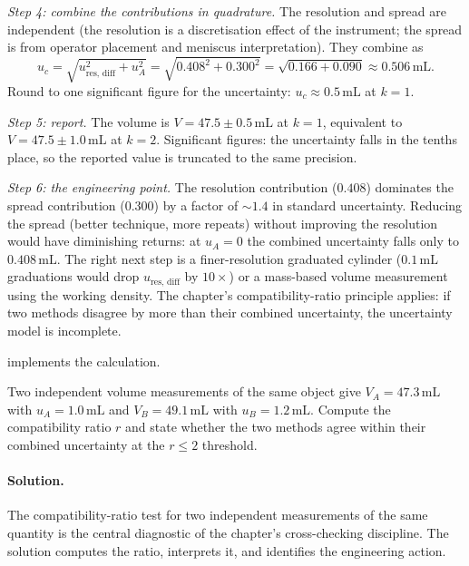 \emph{Step 4: combine the contributions in quadrature.} The
resolution and spread are independent (the resolution is a
discretisation effect of the instrument; the spread is from
operator placement and meniscus interpretation). They combine as
\[
u_{c} = \sqrt{u_{\text{res, diff}}^{2} + u_{A}^{2}} =
\sqrt{0.408^{2} + 0.300^{2}} = \sqrt{0.166 + 0.090} \approx
0.506\,\si{\milli\liter}.
\]
Round to one significant figure for the uncertainty: $u_{c}
\approx 0.5\,\si{\milli\liter}$ at $k = 1$.

\emph{Step 5: report.} The volume is $V = 47.5 \pm 0.5\,\si{\milli
\liter}$ at $k = 1$, equivalent to $V = 47.5 \pm 1.0\,\si{\milli
\liter}$ at $k = 2$. Significant figures: the uncertainty falls in
the tenths place, so the reported value is truncated to the same
precision.

\emph{Step 6: the engineering point.} The resolution contribution
($0.408$) dominates the spread contribution ($0.300$) by a factor
of $\sim 1.4$ in standard uncertainty. Reducing the spread (better
technique, more repeats) without improving the resolution would
have diminishing returns: at $u_{A} = 0$ the combined uncertainty
falls only to $0.408\,\si{\milli\liter}$. The right next step is a
finer-resolution graduated cylinder ($0.1\,\si{\milli\liter}$
graduations would drop $u_{\text{res, diff}}$ by $10\times$) or a
mass-based volume measurement using the working density. The
chapter's compatibility-ratio principle applies: if two methods
disagree by more than their combined uncertainty, the
uncertainty model is incomplete.

implements the calculation.

\begin{exercise}
Two independent volume measurements of the same object give
$V_{A} = 47.3 \,\si{\milli\liter}$ with $u_{A} = 1.0 \,\si{\milli
\liter}$ and $V_{B} = 49.1 \,\si{\milli\liter}$ with $u_{B} = 1.2 \,
\si{\milli\liter}$. Compute the compatibility ratio $r$ and state
whether the two methods agree within their combined uncertainty at
the $r \leq 2$ threshold.
\end{exercise}

\paragraph{Solution.}
The compatibility-ratio test for two independent measurements of
the same quantity is the central diagnostic of the chapter's
cross-checking discipline. The solution computes the ratio,
interprets it, and identifies the engineering action.

